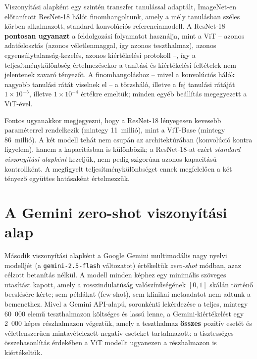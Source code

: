 Viszonyítási alapként egy szintén transzfer tanulással adaptált, ImageNet-en
előtanított ResNet-18 hálót \cite{he2016resnet} finomhangoltunk, amely a mély
tanulásban széles körben alkalmazott, standard konvolúciós referenciamodell.
A ResNet-18 \textbf{pontosan ugyanazt} a feldolgozási folyamatot használja, mint
a ViT -- azonos adatfelosztás
(azonos véletlenmaggal, így azonos teszthalmaz), azonos egyensúlytalanság-kezelés,
azonos kiértékelési protokoll --, így a teljesítménykülönbség értelmezésekor a
tanítási és kiértékelési feltételek nem jelentenek zavaró tényezőt. A
finomhangoláshoz -- mivel a konvolúciós hálók nagyobb tanulási rátát viselnek el
-- a törzsháló, illetve a fej tanulási rátáját $1 \times 10^{-5}$, illetve
$1 \times 10^{-4}$ értékre emeltük; minden egyéb beállítás megegyezett a ViT-ével.

Fontos ugyanakkor megjegyezni, hogy a ResNet-18 lényegesen kevesebb paraméterrel
rendelkezik (mintegy 11~millió), mint a ViT-Base (mintegy 86~millió). A két
modell tehát nem csupán az architektúrában (konvolúció kontra figyelem), hanem a
kapacitásban is különbözik; a ResNet-18-at ezért \emph{standard viszonyítási
alapként} kezeljük, nem pedig szigorúan azonos kapacitású kontrollként. A
megfigyelt teljesítménykülönbséget ennek megfelelően a két tényező együttes
hatásaként értelmezzük.

\section{A Gemini zero-shot viszonyítási alap}

Második viszonyítási alapként a Google Gemini multimodális nagy nyelvi modelljét
\cite{gemini2023} (a \texttt{gemini-2.5-flash} változatot) értékeltük
\textit{zero-shot} módban, azaz célzott betanítás nélkül. A modell minden képhez
egy minimális szöveges utasítást kapott, amely a rosszindulatúság
valószínűségének $[0,1]$ skálán történő becslésére kérte; sem példákat
(few-shot), sem klinikai metaadatot nem adtunk a bemenethez. Mivel a Gemini
API-alapú, soronkénti lekérdezése a teljes, mintegy 60~000 elemű teszthalmazon
költséges és lassú lenne, a Gemini-kiértékelést egy 2~000 képes részhalmazon
végeztük, amely a teszthalmaz \textbf{összes} pozitív esetét és véletlenszerűen
mintavételezett negatív eseteket tartalmazott; a tisztességes összehasonlítás
érdekében a ViT modellt ugyanezen a részhalmazon is kiértékeltük.

